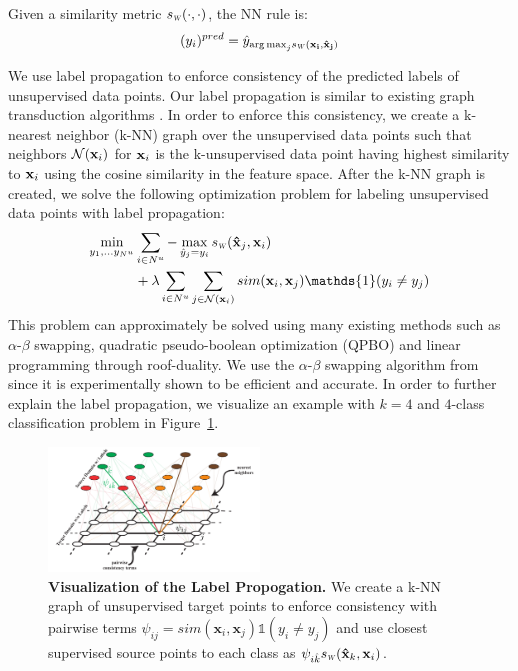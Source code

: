 Given a similarity metric $\sw(\cdot,\cdot)$, the NN rule is:
\begin{equation}
(y_i)^{pred} = \hat{y}_{{\arg\max}_j \sw(\mathbf{x_i}, \mathbf{\hat{x}_j})}
\end{equation}

We use label propagation to enforce consistency of the predicted labels of unsupervised data points. Our label propagation is similar to existing graph transduction algorithms \cite{label_prop1,label_prop2}. In order to enforce this consistency, we create a k-nearest neighbor (k-NN) graph over the unsupervised data points such that neighbors $\mathcal{N}(\mathbf{x}_i)$ for $\mathbf{x}_i$ is the k-unsupervised data point having highest similarity to $\mathbf{x}_i$ using the cosine similarity in the feature space. After the k-NN graph is created, we solve the following optimization problem for labeling unsupervised data points with label propagation:
\begin{equation}
\begin{aligned}
\min_{y_1, \ldots y_{N^u}}  &\sum_{i \in N^u} - \max_{\hat{y}_j=y_i}  \sw(\mathbf{\hat{x}}_j,\mathbf{x}_{i}) \\
&+ \lambda
\sum_{i \in N^u} \sum_{j \in \mathcal{N}(\mathbf{x}_i)} sim(\mathbf{x}_i, \mathbf{x}_j) \mathds{1}(y_i \neq y_j)
\end{aligned}
\label{robtran}
\end{equation}
This problem can approximately be solved using many existing methods such as $\alpha$-$\beta$ swapping, quadratic pseudo-boolean optimization (QPBO) and linear programming through roof-duality. We use the $\alpha$-$\beta$ swapping algorithm from \cite{kolmogrovalphabeta} since it is experimentally shown to be efficient and accurate. In order to further explain the label propagation, we visualize an example with $k=4$ and $4$-class classification problem in Figure~\ref{vis_label_prop}. 

\begin{figure}
\includegraphics[width=0.5\textwidth]{fig11}
\caption{\textbf{Visualization of the Label Propogation.} We create a k-NN graph of unsupervised target points to enforce consistency with pairwise terms 
\mbox{$\psi_{ij}=sim(\mathbf{x}_i, \mathbf{x}_j) \mathds{1}(y_i \neq y_j)$} and use closest supervised source points to each class as 
\mbox{$ \psi_{i\hat{k}} \sw(\mathbf{\hat{x}}_k,\mathbf{x}_{i})$}.} 
\vspace{-1cm}
\label{vis_label_prop}
\end{figure}


